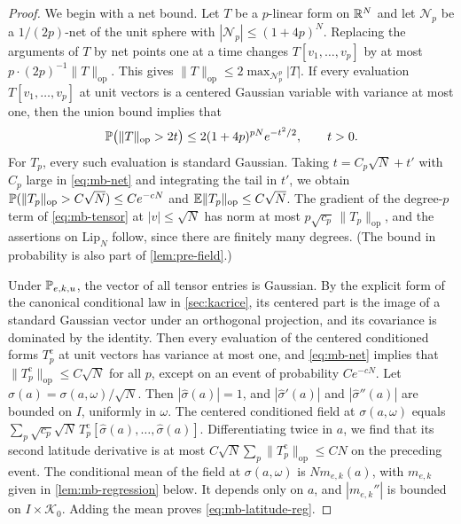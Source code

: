 \begin{proof}
We begin with a net bound. Let $T$ be a $p$-linear form on $\mathbb R^N$ and let $\mathcal N_p$ be a $1/(2p)$-net of the unit sphere with $|\mathcal N_p|\le(1+4p)^N$. Replacing the arguments of $T$ by net points one at a time changes $T[v_1,\dots,v_p]$ by at most $p\cdot(2p)^{-1}\|T\|_{\mathrm{op}}$. This gives $\|T\|_{\mathrm{op}}\le2\max_{\mathcal N_p^p}|T|$. If every evaluation $T[v_1,\dots,v_p]$ at unit vectors is a centered Gaussian variable with variance at most one, then the union bound implies that
\begin{equation}\label{eq:mb-net}
\mathbb P\bigl(\|T\|_{\mathrm{op}}>2t\bigr)\le2(1+4p)^{pN}e^{-t^2/2},\qquad t>0 .
\end{equation}
For $T_p$, every such evaluation is standard Gaussian. Taking $t=C_p\sqrt N+t'$ with $C_p$ large in \eqref{eq:mb-net} and integrating the tail in $t'$, we obtain $\mathbb P(\|T_p\|_{\mathrm{op}}>C\sqrt N)\le Ce^{-cN}$ and $\mathbb E\|T_p\|_{\mathrm{op}}\le C\sqrt N$. The gradient of the degree-$p$ term of \eqref{eq:mb-tensor} at $|v|\le\sqrt N$ has norm at most $p\sqrt{c_p}\,\|T_p\|_{\mathrm{op}}$, and the assertions on $\mathrm{Lip}_N$ follow, since there are finitely many degrees. (The bound in probability is also part of \cref{lem:pre-field}.)

Under $\mathbb P_{e,k,u}$, the vector of all tensor entries is Gaussian. By the explicit form of the canonical conditional law in \cref{sec:kacrice}, its centered part is the image of a standard Gaussian vector under an orthogonal projection, and its covariance is dominated by the identity. Then every evaluation of the centered conditioned forms $T_p^{\mathrm c}$ at unit vectors has variance at most one, and \eqref{eq:mb-net} implies that $\|T^{\mathrm c}_p\|_{\mathrm{op}}\le C\sqrt N$ for all $p$, except on an event of probability $Ce^{-cN}$. Let $\hat\sigma(a)=\sigma(a,\omega)/\sqrt N$. Then $|\hat\sigma(a)|=1$, and $|\hat\sigma'(a)|$ and $|\hat\sigma''(a)|$ are bounded on $I$, uniformly in $\omega$. The centered conditioned field at $\sigma(a,\omega)$ equals $\sum_p\sqrt{c_p}\sqrt N\,T_p^{\mathrm c}[\hat\sigma(a),\dots,\hat\sigma(a)]$. Differentiating twice in $a$, we find that its second latitude derivative is at most $C\sqrt N\sum_p\|T_p^{\mathrm c}\|_{\mathrm{op}}\le CN$ on the preceding event. The conditional mean of the field at $\sigma(a,\omega)$ is $Nm_{e,k}(a)$, with $m_{e,k}$ given in \cref{lem:mb-regression} below. It depends only on $a$, and $|m_{e,k}''|$ is bounded on $I\times\mathcal K_0$. Adding the mean proves \eqref{eq:mb-latitude-reg}.
\end{proof}

